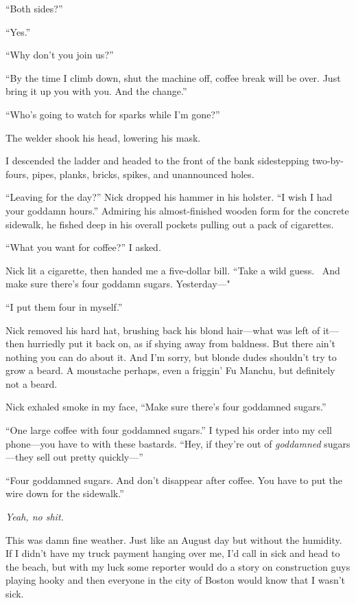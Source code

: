 ``Both sides?''

``Yes.''

``Why don't you join us?''

``By the time I climb down, shut the machine off, coffee break will be
over. Just bring it up you with you. And the change.''

``Who's going to watch for sparks while I'm gone?''

The welder shook his head, lowering his mask. ~

I descended the ladder and headed to the front of the bank sidestepping
two-by-fours, pipes, planks, bricks, spikes, and unannounced holes.

``Leaving for the day?'' Nick dropped his hammer in his holster. ``I
wish I had your goddamn hours.'' Admiring his almost-finished wooden
form for the concrete sidewalk, he fished deep in his overall pockets
pulling out a pack of cigarettes.

``What you want for coffee?'' I asked. ~

Nick lit a cigarette, then handed me a five-dollar bill. ``Take a wild
guess. ~And make sure there's four goddamn sugars. Yesterday---"

``I put them four in myself.''

Nick removed his hard hat, brushing back his blond hair---what was left
of it---then hurriedly put it back on, as if shying away from baldness.
But there ain't nothing you can do about it. And I'm sorry, but blonde
dudes shouldn't try to grow a beard. A moustache perhaps, even a
friggin' Fu Manchu, but definitely not a beard. ~

Nick exhaled smoke in my face, ``Make sure there's four goddamned
sugars.''

``One large coffee with four goddamned sugars.'' I typed his order into
my cell phone---you have to with these bastards. ``Hey, if they're out
of \emph{goddamned} sugars---they sell out pretty quickly---''

``Four goddamned sugars. And don't disappear after coffee. You have to
put the wire down for the sidewalk.''

\emph{Yeah, no shit.}

This was damn fine weather. Just like an August day but without the
humidity. If I didn't have my truck payment hanging over me, I'd call in
sick and head to the beach, but with my luck some reporter would do a
story on construction guys playing hooky and then everyone in the city
of Boston would know that I wasn't sick.

